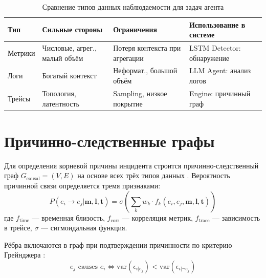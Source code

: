 \begin{table}[H]
\centering
\caption{Сравнение типов данных наблюдаемости для задач агента}
\label{tab:observability_pillars}
\setlength{\tabcolsep}{2pt}
\begin{sloppypar}
\begin{tabular}{@{}|>{\raggedright\arraybackslash}p{2cm}|>{\raggedright\arraybackslash}p{3.5cm}|>{\raggedright\arraybackslash}p{3.5cm}|>{\raggedright\arraybackslash}p{7cm}|@{}}
\hline
\textbf{Тип} & \textbf{Сильные стороны} & \textbf{Ограничения} & \textbf{Использование в системе} \\
\hline
Метрики & Числовые, агрег., малый объём & Потеря контекста при агрегации & LSTM Detector: обнаружение \\
\hline
Логи & Богатый контекст & Неформат., большой объём & LLM Agent: анализ логов \\
\hline
Трейсы & Топология, латентность & Sampling, низкое покрытие & Engine: причинный граф \\
\hline
\end{tabular}
\end{sloppypar}
\end{table}

\section{Причинно-следственные графы}

Для определения корневой причины инцидента строится причинно-следственный граф $G_{\text{causal}} = (V, E)$ на основе всех трёх типов данных \cite{distributed_tracing_survey}. Вероятность причинной связи определяется тремя признаками:
\begin{equation}
P(e_i \to e_j | \mathbf{m}, \mathbf{l}, \mathbf{t}) = \sigma\left(\sum_{k} w_k \cdot f_k(e_i, e_j, \mathbf{m}, \mathbf{l}, \mathbf{t})\right)
\label{eq:causal_probability}
\end{equation}
где $f_{\text{time}}$ --- временная близость, $f_{\text{corr}}$ --- корреляция метрик, $f_{\text{trace}}$ --- зависимость в трейсе, $\sigma$ --- сигмоидальная функция.

Рёбра включаются в граф при подтверждении причинности по критерию Грейнджера \cite{distributed_tracing_survey}:
\begin{equation}
e_j \text{ causes } e_i \Leftrightarrow \text{var}(\epsilon_{i|e_j}) < \text{var}(\epsilon_{i|\neg e_j})
\label{eq:granger_causality}
\end{equation}

